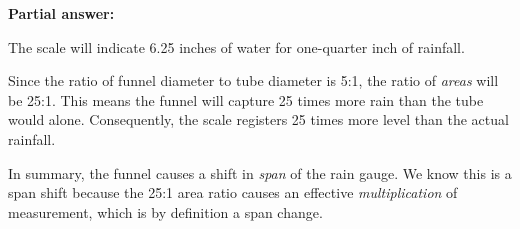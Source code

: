 
\noindent
{\bf Partial answer:}

\vskip 10pt

The scale will indicate 6.25 inches of water for one-quarter inch of rainfall.







Since the ratio of funnel diameter to tube diameter is 5:1, the ratio of {\it areas} will be 25:1.  This means the funnel will capture 25 times more rain than the tube would alone.  Consequently, the scale registers 25 times more level than the actual rainfall.

In summary, the funnel causes a shift in {\it span} of the rain gauge.  We know this is a span shift because the 25:1 area ratio causes an effective {\it multiplication} of measurement, which is by definition a span change.




